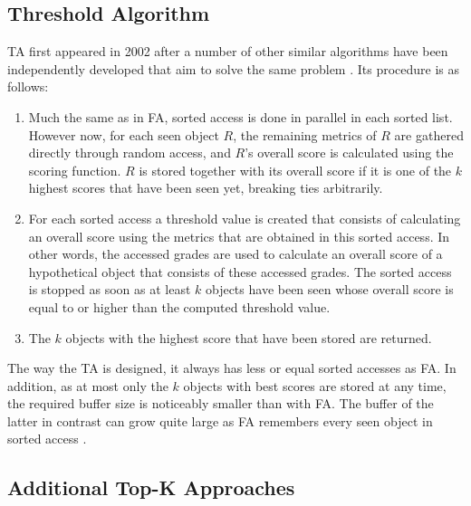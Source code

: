 \subsection{Threshold Algorithm}

TA first appeared in 2002 after a number of other similar algorithms have been independently developed that aim to solve the same problem \cite{fagin2002a}. Its procedure is as follows:

\begin{enumerate}

\item Much the same as in FA, sorted access is done in parallel in each sorted list. However now, for each seen object $R$, the remaining metrics of $R$ are gathered directly through random access, and $R$'s overall score is calculated using the scoring function. $R$ is stored together with its overall score if it is one of the $k$ highest scores that have been seen yet, breaking ties arbitrarily. 

\item For each sorted access a threshold value is created that consists of calculating an overall score using the metrics that are obtained in this sorted access. In other words, the accessed grades are used to calculate an overall score of a hypothetical object that consists of these accessed grades.  The sorted access is stopped as soon as at least $k$ objects have been seen whose overall score is equal to or higher than the computed threshold value. 

\item The $k$ objects with the highest score that have been stored are returned.

\end{enumerate}
 

 The way the TA is designed, it always has less or equal sorted accesses as FA. In addition, as at most only the $k$ objects with best scores are stored at any time, the required buffer size is noticeably smaller than with FA. The buffer of the latter in contrast can grow quite large as FA remembers every seen object in sorted access \cite{fagin2002}.



\subsection{Additional Top-K Approaches}

